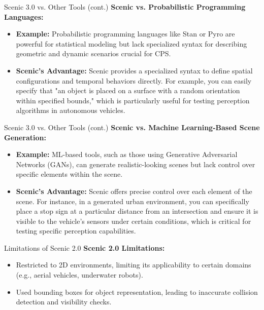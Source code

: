 \documentclass{beamer}
\begin{document}
\begin{frame}{Scenic 3.0 vs. Other Tools (cont.)}
    \textbf{Scenic vs. Probabilistic Programming Languages:}\\
    \begin{itemize}
        \setlength{\itemindent}{-1em} 
        \item \textbf{Example:} Probabilistic programming languages like Stan or Pyro are powerful for statistical modeling but lack specialized syntax for describing geometric and dynamic scenarios crucial for CPS.
        \item \textbf {Scenic's Advantage:} Scenic provides a specialized syntax to define spatial configurations and temporal behaviors directly. For example, you can easily specify that "an object is placed on a surface with a random orientation within specified bounds," which is particularly useful for testing perception algorithms in autonomous vehicles.
    \end{itemize}
\end{frame}

\begin{frame}{Scenic 3.0 vs. Other Tools (cont.)}
    \textbf{Scenic vs. Machine Learning-Based Scene Generation:}\\
    \begin{itemize}
        \setlength{\itemindent}{-1em} 
        \item \textbf{Example:} ML-based tools, such as those using Generative Adversarial Networks (GANs), can generate realistic-looking scenes but lack control over specific elements within the scene.
        \item \textbf {Scenic's Advantage:} Scenic offers precise control over each element of the scene. For instance, in a generated urban environment, you can specifically place a stop sign at a particular distance from an intersection and ensure it is visible to the vehicle's sensors under certain conditions, which is critical for testing specific perception capabilities.
    \end{itemize}
\end{frame}

\begin{frame}{Limitations of Scenic 2.0}  
    \textbf{Scenic 2.0 Limitations:}\\
    \begin{itemize}
        \setlength{\itemindent}{-1em} 
        \item Restricted to 2D environments, limiting its applicability to certain domains (e.g., aerial vehicles, underwater robots).
        \item Used bounding boxes for object representation, leading to inaccurate collision detection and visibility checks.
    \end{itemize}
\end{frame}
\end{document}
